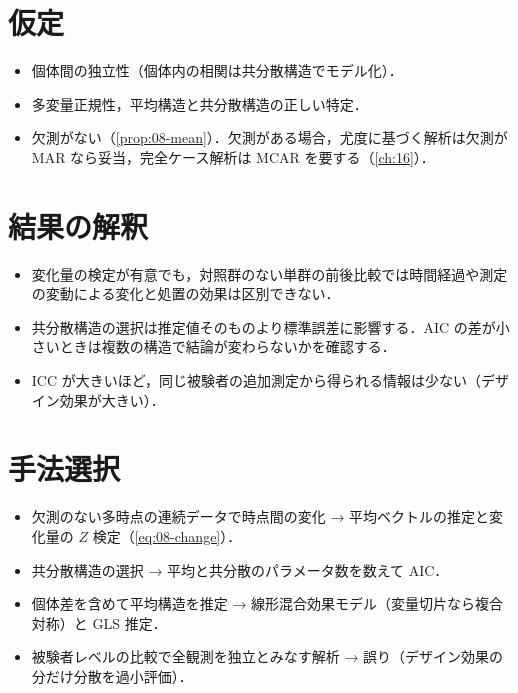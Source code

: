 \section{仮定}\label{sec:08-assump}
\begin{itemize}
\item 個体間の独立性（個体内の相関は共分散構造でモデル化）．
\item 多変量正規性，平均構造と共分散構造の正しい特定．
\item 欠測がない（\cref{prop:08-mean}）．欠測がある場合，尤度に基づく解析は欠測が MAR なら妥当，完全ケース解析は MCAR を要する（\cref{ch:16}）．
\end{itemize}

\section{結果の解釈}\label{sec:08-interp}
\begin{itemize}
\item 変化量の検定が有意でも，対照群のない単群の前後比較では時間経過や測定の変動による変化と処置の効果は区別できない．
\item 共分散構造の選択は推定値そのものより標準誤差に影響する．AIC の差が小さいときは複数の構造で結論が変わらないかを確認する．
\item ICC が大きいほど，同じ被験者の追加測定から得られる情報は少ない（デザイン効果が大きい）．
\end{itemize}

\section{手法選択}\label{sec:08-choice}
\begin{itemize}
\item 欠測のない多時点の連続データで時点間の変化 → 平均ベクトルの推定と変化量の $Z$ 検定（\cref{eq:08-change}）．
\item 共分散構造の選択 → 平均と共分散のパラメータ数を数えて AIC．
\item 個体差を含めて平均構造を推定 → 線形混合効果モデル（変量切片なら複合対称）と GLS 推定．
\item 被験者レベルの比較で全観測を独立とみなす解析 → 誤り（デザイン効果の分だけ分散を過小評価）．
\end{itemize}

